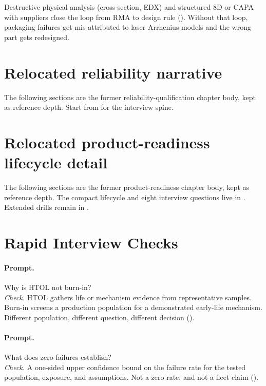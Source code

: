 Destructive physical analysis (cross-section, EDX) and structured 8D or CAPA
with suppliers close the loop from RMA to design rule
(). Without that loop, packaging
failures get mis-attributed to laser Arrhenius models and the wrong part gets
redesigned.

\section{Relocated reliability narrative}
\label{sec:relocated-reliability-narrative}

The following sections are the former reliability-qualification chapter body,
kept as reference depth. Start from  for the interview
spine.



\section{Relocated product-readiness lifecycle detail}
\label{sec:relocated-product-readiness-narrative}

The following sections are the former product-readiness chapter body, kept as
reference depth. The compact lifecycle and eight interview questions live in
. Extended drills remain
in .



\section{Rapid Interview Checks}

\paragraph{Prompt.} Why is HTOL not burn-in?\\
\textit{Check.} HTOL gathers life or mechanism evidence from representative
samples. Burn-in screens a production population for a demonstrated early-life
mechanism. Different population, different question, different decision
().

\paragraph{Prompt.} What does zero failures establish?\\
\textit{Check.} A one-sided upper confidence bound on the failure rate for the
tested population, exposure, and assumptions. Not a zero rate, and not a fleet
claim ().

